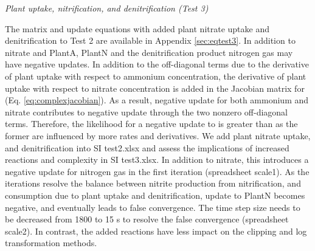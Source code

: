 \documentclass[gmd, manuscript]{copernicus}
\begin{document}
\noindent \emph{Plant uptake, nitrification, and denitrification (Test 3)}

The matrix and update equations with added plant nitrate uptake and
denitrification to Test 2 are available in Appendix \ref{sec:eqtest3}. In addition
to nitrate and PlantA, PlantN and the denitrification product nitrogen gas may
have negative updates. In addition to the off-diagonal terms due to the
derivative of plant uptake with respect to ammonium concentration, the
derivative of plant uptake with respect to nitrate concentration is added in
the Jacobian matrix for  (Eq. \ref{eq:complexjacobian}). As a
result, negative update for both ammonium and nitrate contributes to
negative  update through the two nonzero off-diagonal terms.
Therefore, the likelihood for a negative update to   is greater
than  as
the former are influenced by more rates and derivatives. We add plant nitrate
uptake, and denitrification into SI test2.xlsx and
assess the implications of increased reactions and complexity in SI
test3.xlsx. In addition to nitrate, this introduces a negative update for
nitrogen gas in the first iteration (spreadsheet scale1).
As the iterations resolve the balance between nitrite production from
nitrification, and consumption due to plant uptake and denitrification, update
to PlantN becomes negative, and eventually leads to false convergence. The time
step size needs to be decreased from 1800 to 15 \unit{s} to resolve the false
convergence (spreadsheet scale2). In contrast, the added reactions have less
impact on the clipping and log transformation methods. 
\end{document}
